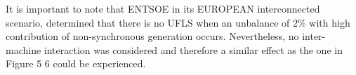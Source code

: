 It is important to note that ENTSOE in its EUROPEAN interconnected scenario, determined that there is no UFLS when an unbalance of 2\% with high contribution of non-synchronous generation occurs. Nevertheless, no inter-machine interaction was considered and therefore a similar effect as the one in Figure 5 6 could be experienced.








